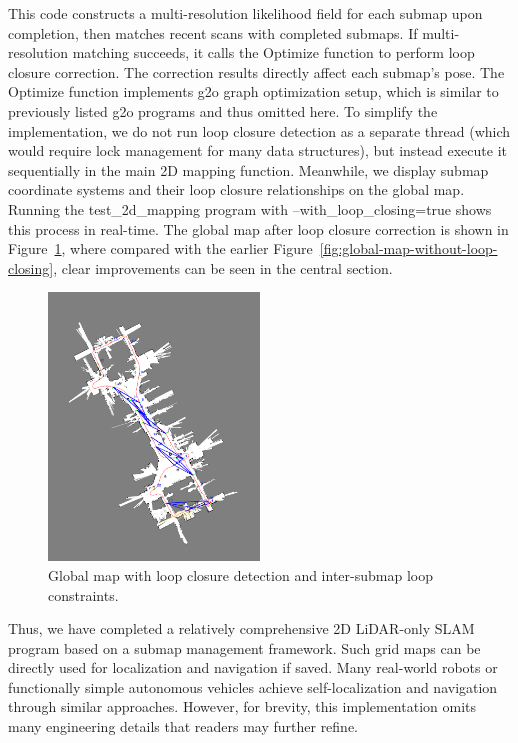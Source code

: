 This code constructs a multi-resolution likelihood field for each submap upon completion, then matches recent scans with completed submaps. If multi-resolution matching succeeds, it calls the Optimize function to perform loop closure correction. The correction results directly affect each submap's pose. The Optimize function implements g2o graph optimization setup, which is similar to previously listed g2o programs and thus omitted here. To simplify the implementation, we do not run loop closure detection as a separate thread (which would require lock management for many data structures), but instead execute it sequentially in the main 2D mapping function. Meanwhile, we display submap coordinate systems and their loop closure relationships on the global map. Running the test\_2d\_mapping program with --with\_loop\_closing=true shows this process in real-time. The global map after loop closure correction is shown in Figure~\ref{fig:global-map}, where compared with the earlier Figure~\ref{fig:global-map-without-loop-closing}, clear improvements can be seen in the central section.

\begin{figure}[!t]
	\centering
	\includegraphics[width=0.5\textwidth]{resources/2d-lidar-mapping/global-map.png}
	\caption{Global map with loop closure detection and inter-submap loop constraints.}
	\label{fig:global-map}
\end{figure}

Thus, we have completed a relatively comprehensive 2D LiDAR-only SLAM program based on a submap management framework. Such grid maps can be directly used for localization and navigation if saved. Many real-world robots or functionally simple autonomous vehicles achieve self-localization and navigation through similar approaches. However, for brevity, this implementation omits many engineering details that readers may further refine.

